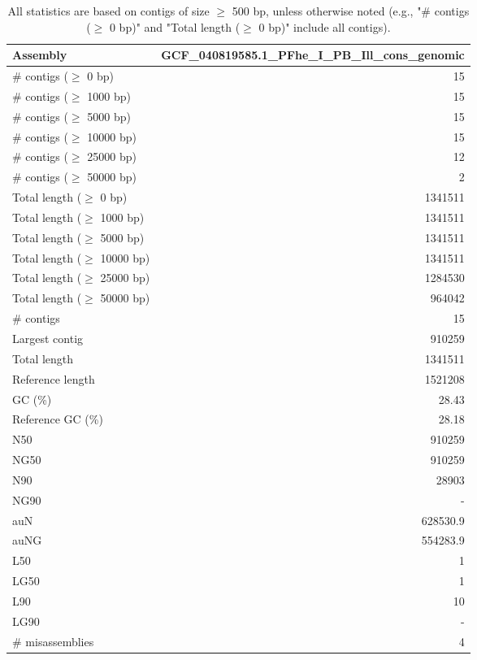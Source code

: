 \documentclass[12pt,a4paper]{article}
\begin{document}
\begin{table}[ht]
\begin{center}
\caption{All statistics are based on contigs of size $\geq$ 500 bp, unless otherwise noted (e.g., "\# contigs ($\geq$ 0 bp)" and "Total length ($\geq$ 0 bp)" include all contigs).}
\begin{tabular}{|l*{1}{|r}|}
\hline
Assembly & GCF\_040819585.1\_PFhe\_I\_PB\_Ill\_cons\_genomic \\ \hline
\# contigs ($\geq$ 0 bp) & 15 \\ \hline
\# contigs ($\geq$ 1000 bp) & 15 \\ \hline
\# contigs ($\geq$ 5000 bp) & 15 \\ \hline
\# contigs ($\geq$ 10000 bp) & 15 \\ \hline
\# contigs ($\geq$ 25000 bp) & 12 \\ \hline
\# contigs ($\geq$ 50000 bp) & 2 \\ \hline
Total length ($\geq$ 0 bp) & 1341511 \\ \hline
Total length ($\geq$ 1000 bp) & 1341511 \\ \hline
Total length ($\geq$ 5000 bp) & 1341511 \\ \hline
Total length ($\geq$ 10000 bp) & 1341511 \\ \hline
Total length ($\geq$ 25000 bp) & 1284530 \\ \hline
Total length ($\geq$ 50000 bp) & 964042 \\ \hline
\# contigs & 15 \\ \hline
Largest contig & 910259 \\ \hline
Total length & 1341511 \\ \hline
Reference length & 1521208 \\ \hline
GC (\%) & 28.43 \\ \hline
Reference GC (\%) & 28.18 \\ \hline
N50 & 910259 \\ \hline
NG50 & 910259 \\ \hline
N90 & 28903 \\ \hline
NG90 & - \\ \hline
auN & 628530.9 \\ \hline
auNG & 554283.9 \\ \hline
L50 & 1 \\ \hline
LG50 & 1 \\ \hline
L90 & 10 \\ \hline
LG90 & - \\ \hline
\# misassemblies & 4 \\ \hline

\end{tabular}
\end{center}
\end{table}
\end{document}
